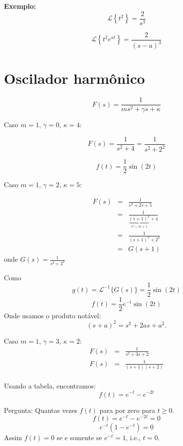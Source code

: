 \documentclass[a4paper,10pt]{book}
\begin{document}
{\bf Exemplo:}
$$\mathcal{L}\left\{t^2\right\}=\frac{2}{s^3}$$
   
$$\mathcal{L}\left\{t^2e^{at}\right\}=\frac{2}{(s-a)^3}$$
   
  \section{Oscilador harmônico}
$$F(s)=\frac{1}{ms^2+\gamma s+ \kappa}$$


Caso $m=1$, $\gamma=0$, $\kappa =4$:

$$F(s)=\frac{1}{s^2+ 4}=\frac{1}{s^2+ 2^2}$$

$$f(t)=\frac{1}{2}\sin(2t)$$

Caso $m=1$, $\gamma=2$, $\kappa =5$:

\begin{eqnarray*}F(s)&=&\frac{1}{s^2+2 s+ 5}\\
&=&\frac{1}{\underbrace{(s+1)^2}_{s^2+2s+1}+4}\\
&=&\frac{1}{(s+1)^2+2^2}\\
&=&G(s+1)
 \end{eqnarray*}
onde $G(s)=\frac{1}{s^2+2^2}$
 
 Como $$g(t)=\mathcal{L}^{-1}\{G(s)\}=\frac{1}{2}\sin(2t)$$ $$f(t)=\frac{1}{2}e^{-t}\sin(2t)$$
Onde usamos o produto notável: $$(s+a)^2=s^2+2as+a^2.$$
 
 Caso $m=1$, $\gamma=3$, $\kappa=2$:
\begin{eqnarray*}F(s)&=&\frac{1}{s^2+3 s+ 2}\\
F(s)&=&\frac{1}{(s+1)(s+2)}\\
 \end{eqnarray*}

 Usando a tabela, encontramos:
 $$f(t)=e^{-t}-e^{-2t}$$
 
 Pergunta: Quantas vezes $f(t)$ para por zero para $t\geq 0$.
 $$f(t)=e^{-t}-e^{-2t}=0$$
 $$e^{-t}(1-e^{-t})=0$$
  Assim $f(t)=0$ se e somente se $e^{-t}=1$, i.e., $t=0$.
  
\end{document}
